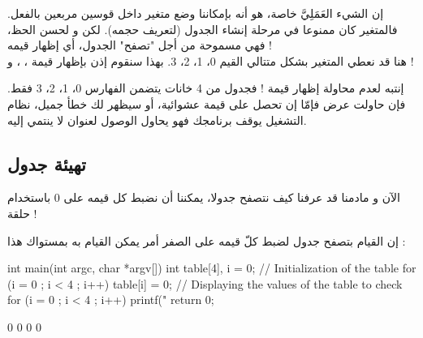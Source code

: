 إن الشيء العَمَلِيَّ خاصة، هو أنه بإمكاننا وضع متغير داخل قوسين مربعين بالفعل. فالمتغير كان ممنوعا في مرحلة إنشاء الجدول (لتعريف حجمه). لكن و لحسن الحظ، فهي مسموحة من أجل "تصفح" الجدول، أي إظهار قيمه !\\
هنا قد نعطي المتغير
بشكل متتالي القيم 0، 1، 2، 3. بهذا سنقوم إذن بإظهار قيمة
،
،
و
 !
\begin{critical}
  إنتبه لعدم محاولة إظهار قيمة
 !
فجدول من 4 خانات يتضمن الفهارس 0، 1، 2، 3 فقط. فإن حاولت عرض
فإمّا إن تحصل على قيمة عشوائية، أو سيظهر لك خطأ جميل، نظام التشغيل يوقف برنامجك فهو يحاول الوصول لعنوان لا ينتمي إليه.
\end{critical}

\subsection{تهيئة جدول}
الآن و مادمنا قد عرفنا كيف نتصفح جدولا، يمكننا أن نضبط كل قيمه على 0 باستخدام حلقة !

إن القيام بتصفح جدول لضبط كلّ قيمه على الصفر أمر يمكن القيام به بمستواك هذا :
\begin{Csource}
int main(int argc, char *argv[])
{
	int table[4], i = 0;
	// Initialization of the table
	for (i = 0 ; i < 4 ; i++)
	{
    		table[i] = 0;
	}
	// Displaying the values of the table to check
	for (i = 0 ; i < 4 ; i++)
	{
    		printf("%
	}
	return 0;
}
\end{Csource}
\begin{Console}
0
0
0
0
\end{Console}
